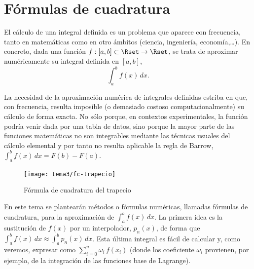 \newcommand{\ox}{\overline x}

\section{Fórmulas de cuadratura}
\label{sect:form-de-cuadratura}



El cálculo de una integral definida es un problema que aparece con
frecuencia, tanto en matemáticas como en otro ámbitos (ciencia,
ingeniería, economía,\dots). En concreto, dada una función
$f:[a,b]\subset\Rset\to\Rset$, se trata de aproximar numéricamente su
integral definida en $[a,b]$,
\begin{equation*}
  \int_a^b f(x)\,dx.
\end{equation*}

La necesidad de la aproximación numérica de integrales definidas
estriba en que, con frecuencia, resulta imposible (o demasiado costoso
computacionalmente) su cálculo de forma exacta. No sólo porque, en
contextos experimentales, la función podría venir dada por una tabla
de datos, sino porque la mayor parte de las funciones matemáticas no
son integrables mediante las técnicas usuales del cálculo elemental
y por tanto no resulta aplicable la regla de Barrow, $\int_a^b f(x)\,
dx=F(b)-F(a)$.

\begin{figure}
  \centering
    \texttt{[image: tema3/fc-trapecio]}
  \caption{Fórmula de cuadratura del trapecio}
  \label{fig:fc-trapecio}
\end{figure}
En este tema se plantearán métodos o fórmulas numéricas, llamadas
fórmulas de cuadratura, para la aproximación de $\int_a^b f(x)\,
dx$. La primera idea es la sustitución de $f(x)$ por un interpolador,
$p_n(x)$, de forma que $\int_a^bf(x)\,dx \approx \int_a^b p_n(x)\,
dx$. Esta última integral es fácil de calcular y, como veremos,
expresar como $\sum_{i=0}^n \omega_i \, f(x_i)$ (donde los coeficiente
$\omega_i$ provienen, por ejemplo, de la integración de las
funciones base de Lagrange).



